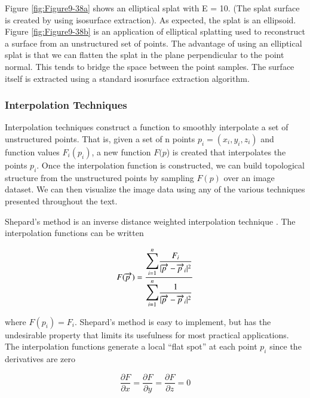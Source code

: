 Figure \ref{fig:Figure9-38a} shows an elliptical splat with E = 10. (The splat surface is created by using isosurface extraction). As expected, the splat is an ellipsoid. Figure \ref{fig:Figure9-38b} is an application of elliptical splatting used to reconstruct a surface from an unstructured set of points. The advantage of using an elliptical splat is that we can flatten the splat in the plane perpendicular to the point normal. This tends to bridge the space between the point samples. The surface itself is extracted using a standard isosurface extraction algorithm.

\subsubsection{Interpolation Techniques}

Interpolation techniques construct a function to smoothly interpolate a set of unstructured points. That is, given a set of n points $p_i = (x_i, y_i, z_i)$ and function values $F_i(p_i)$, a new function $F(p$) is created that interpolates the points $p_i$. Once the interpolation function is constructed, we can build topological structure from the unstructured points by sampling $F(p)$ over an image dataset. We can then visualize the image data using any of the various techniques presented throughout the text. 

Shepard's method is an inverse distance weighted interpolation technique \cite{Wixom78}. The interpolation functions can be written

\begin{equation}\label{eq:9.25}
F(\overrightarrow{p\ }) = \dfrac{\mathlarger{\mathlarger{\sum}}_{i=1}^n \dfrac{F_i}{\vert\overrightarrow{p\ } - \overrightarrow{p\ }_i\vert^2}}{\mathlarger{\mathlarger{\sum}}_{i=1}^n \dfrac{1}{\vert\overrightarrow{p\ } - \overrightarrow{p\ }_i \vert^2}}
\end{equation}

\noindent where $F(p_i) = F_i$. Shepard's method is easy to implement, but has the undesirable property that limits its usefulness for most practical applications. The interpolation functions generate a local ``flat spot'' at each point $p_i$ since the derivatives are zero

\begin{equation}\label{eq:9.26}
\dfrac{\partial F}{\partial x} =
\dfrac{\partial F}{\partial y} =
\dfrac{\partial F}{\partial z} = 0
\end{equation}

